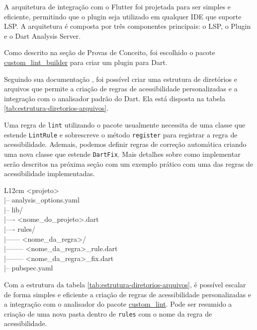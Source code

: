 A arquitetura de integração com o Flutter foi projetada para ser simples e eficiente, permitindo que o plugin seja utilizado em qualquer IDE que suporte LSP. A arquitetura é composta por três componentes principais: o LSP, o Plugin e o Dart Analysis Server.

Como descrito na seção de Provas de Conceito, foi escolhido o pacote \href{https://pub.dev/packages/custom_lint_builder}{custom\_lint\_builder} para criar um plugin para Dart.

Seguindo sua documentação \cite{customlintbuilder}, foi possível criar uma estrutura de diretórios e arquivos que permite a criação de regras de acessibilidade personalizadas e a integração com o analisador padrão do Dart. Ela está disposta na tabela  \ref{tab:estrutura-diretorios-arquivos}.

Uma regra de \texttt{lint} utilizando o pacote usualmente necessita de uma classe que estende \texttt{LintRule} e sobrescreve o método \texttt{register} para registrar a regra de acessibilidade. Ademais, podemos definir regras de correção automática criando uma nova classe que estende \texttt{DartFix}. Mais detalhes sobre como implementar serão descritos na próxima seção com um exemplo prático com uma das regras de acessibilidade implementadas.

\begin{table}[!htbp]
	\centering
	\renewcommand{\arraystretch}{1.1}
	\caption{Estrutura de diretórios e arquivos do projeto}
	\label{tab:estrutura-diretorios-arquivos}
	\ttfamily
	\begin{tabular}{ L{12cm} }
		\hline
		<projeto> \\
		|-- analysis\_options.yaml \\
		|-- lib/ \\
		|---- <nome\_do\_projeto>.dart \\
		|---- rules/ \\
		|------ <nome\_da\_regra>/ \\
		|-------- <nome\_da\_regra>\_rule.dart \\
		|-------- <nome\_da\_regra>\_fix.dart \\
		|-- pubspec.yaml \\
		\hline
	\end{tabular}
	\fontfamily{\rmdefault}\selectfont
	\vspace{2mm}
\end{table}

Com a estrutura da tabela \ref{tab:estrutura-diretorios-arquivos}, é possível escalar de forma simples e eficiente a criação de regras de acessibilidade personalizadas e a integração com o analisador do pacote \href{https://pub.dev/packages/custom_lint}{custom\_lint}. Pode ser resumido a criação de uma nova pasta dentro de \texttt{rules} com o nome da regra de acessibilidade.

